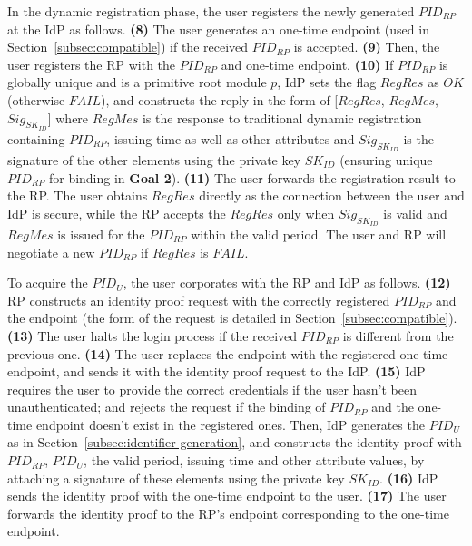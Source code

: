 In the dynamic registration phase, the user registers the newly generated $PID_{RP}$ at the IdP as follows. \textbf{(8)} The user generates an one-time endpoint (used in Section~\ref{subsec:compatible}) if the received $PID_{RP}$ is accepted. \textbf{(9)} Then, the user registers the RP with the $PID_{RP}$ and one-time endpoint. \textbf{(10)} If $PID_{RP}$ is globally unique and is a primitive root module $p$, IdP sets the flag $RegRes$ as $OK$ (otherwise $FAIL$), and constructs the reply in the form of
[$RegRes$, $RegMes$, $Sig_{SK_{ID}}$]
where $RegMes$ is the response to traditional dynamic registration containing $PID_{RP}$, issuing time as well as other attributes and $Sig_{SK_{ID}}$ is the signature of the other elements using the private key $SK_{ID}$ (ensuring unique $PID_{RP}$ for binding in \textbf{Goal 2}). \textbf{(11)} The user forwards the registration result to the RP. The user obtains $RegRes$ directly as the connection between the user and IdP is secure, while the RP accepts the $RegRes$ only when $Sig_{SK_{ID}}$ is valid
and $RegMes$ is issued for the $PID_{RP}$ within the valid period. The user and RP will negotiate a new $PID_{RP}$ if $RegRes$ is $FAIL$.

To acquire the $PID_U$, the user corporates with the RP and IdP as follows. \textbf{(12)} RP constructs an identity proof request with the correctly registered $PID_{RP}$ and the endpoint (the form of the request is detailed in Section~\ref{subsec:compatible}). \textbf{(13)} The user halts the login process if the received $PID_{RP}$ is different from the previous one. \textbf{(14)} The user replaces the endpoint with the registered one-time endpoint, and sends it with the identity proof request to the IdP. \textbf{(15)} IdP requires the user to provide the correct credentials if the user hasn't been unauthenticated; and rejects the request if the binding of $PID_{RP}$ and the one-time endpoint doesn't exist in the registered ones. Then, IdP generates the $PID_U$ as in Section~\ref{subsec:identifier-generation}, and constructs the identity proof with $PID_{RP}$, $PID_U$, the valid period, issuing time and other attribute values, by attaching a signature of these elements using the private key $SK_{ID}$. \textbf{(16)} IdP sends the identity proof with the one-time endpoint to the user. \textbf{(17)} The user forwards the identity proof to the RP's endpoint corresponding to the one-time endpoint.

